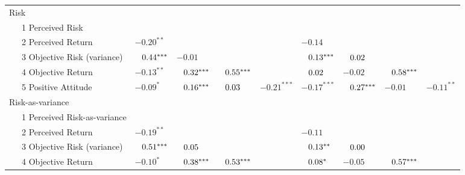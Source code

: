 \begin{table}
{\begin{longtable}{lllllllll}
\midrule                                                                                                                                                        
\endhead                                                                                                                                                        
Risk &  &  &  &  &  &  &  & \\                                                                                                                                  
\ \ \ 1 Perceived Risk &  &  &  &  &  &  &  & \\                                                                                                                
\ \ \ 2 Perceived Return & $-0.20^{**}$ &  &  &  & $-0.14$ &  &  & \\                                                                                           
\ \ \ 3 Objective Risk (variance) & $\hphantom{-}0.44^{***}$ & $-0.01$ &  &  & $\hphantom{-}0.13^{***}$ & $\hphantom{-}0.02$ &  & \\                            
\ \ \ 4 Objective Return & $-0.13^{**}$ & $\hphantom{-}0.32^{***}$ & $\hphantom{-}0.55^{***}$ &  & $\hphantom{-}0.02$ & $-0.02$ & $\hphantom{-}0.58^{***}$ & \\ 
\ \ \ 5 Positive Attitude & $-0.09^{*}$ & $\hphantom{-}0.16^{***}$ & $\hphantom{-}0.03$ & $-0.21^{***}$ & $-0.17^{***}$ & $\hphantom{-}0.27^{***}$ & $-0.01$ & $-0.11^{**}$\\                                                                                                                                                   
Risk-as-variance &  &  &  &  &  &  &  & \\                                                                                                                      
\ \ \ 1 Perceived Risk-as-variance &  &  &  &  &  &  &  & \\                                                                                                    
\ \ \ 2 Perceived Return & $-0.19^{**}$ &  &  &  & $-0.11$ &  &  & \\                                                                                           
\ \ \ 3 Objective Risk (variance) & $\hphantom{-}0.51^{***}$ & $\hphantom{-}0.05$ &  &  & $\hphantom{-}0.13^{**}$ & $\hphantom{-}0.00$ &  & \\                  
\ \ \ 4 Objective Return & $-0.10^{*}$ & $\hphantom{-}0.38^{***}$ & $\hphantom{-}0.53^{***}$ &  & $\hphantom{-}0.08^{*}$ & $-0.05$ & $\hphantom{-}0.57^{***}$ & 

\end{longtable}}
\end{table}
